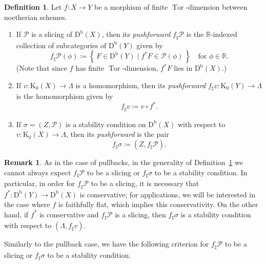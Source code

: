 \documentclass[11pt, reqno]{amsart}
\numberwithin{equation}{section}
\theoremstyle{plain}
\theoremstyle{remark}
\theoremstyle{definition}
\newtheorem{definition}[theorem]{Definition}
\newtheorem{remark}[theorem]{Remark}
\theoremstyle{italicsname}
\newcommand{\st}{\mid}
\newcommand{\set}[1]{\left\{ \, #1 \, \right\}}
\newcommand{\Db}{\mathrm{D^b}}
\DeclareMathOperator{\Tor}{Tor}
\newcommand{\cP}{\mathscr{P}}
\newcommand{\rK}{\mathrm{K}}
\def\RR{\ensuremath{\mathbb{R}}}
\begin{document}
\begin{definition}\label{def:Pushforward}
Let $f\colon X\to Y$ be a morphism of finite $\Tor$-dimension between noetherian schemes. 
\begin{enumerate}[{\rm (1)}]
\item If $\cP$ is a slicing of $\Db(X)$, then its \emph{pushforward} $f_{\sharp} \cP$ is the $\RR$-indexed collection of subcategories of $\Db(Y)$ given by 
\begin{equation*}
f_\sharp\cP(\phi)\coloneqq \set{F\in\Db(Y)\st f^*F\in\cP(\phi)} \quad\text{for }\phi \in\RR.
\end{equation*}
(Note that since $f$ has finite $\Tor$-dimension, $f^*F$ lies in $\Db(X)$.) 
\item If $v \colon \rK_0(X) \to \Lambda$ is a homomorphism, then its \emph{pushforward} $f_{\sharp}v \colon \rK_0(Y) \to \Lambda$ is the homomorphism given by 
\begin{equation*}
f_{\sharp} v \coloneqq v \circ f^*.
\end{equation*} 
\item If $\sigma = (Z,\cP)$ is a stability condition on $\Db(X)$ with respect to $v \colon \rK_0(X) \to \Lambda$, then its \emph{pushforward} is the pair 
\begin{equation*}
f_{\sharp} \sigma \coloneqq (Z,f_{\sharp}\cP). 
\end{equation*} 
\end{enumerate}    
\end{definition}

\begin{remark}
\label{remark-pushforward-slicing-stability}
As in the case of pullbacks, in the generality of Definition~\ref{def:Pushforward} we cannot always expect $f_{\sharp}\cP$ to be a slicing or $f_{\sharp}\sigma$ to be a stability condition. 
In particular, in order for $f_{\sharp}\cP$ to be a slicing, it is necessary that $f^* \colon \Db(Y) \to \Db(X)$ is conservative; for applications, we will be interested in the case where $f$ is faithfully flat, which implies this conservativity. 
On the other hand, if $f^*$ is conservative and $f_{\sharp}\cP$ is a slicing, then $f_{\sharp}\sigma$ is a stability condition with respect to $(\Lambda, f_{\sharp} v)$. 
\end{remark}

Similarly to the pullback case, we have the following criterion for $f_{\sharp} \cP$ to be a slicing or $f_{\sharp}\sigma$ to be a stability condition. 
\end{document}
